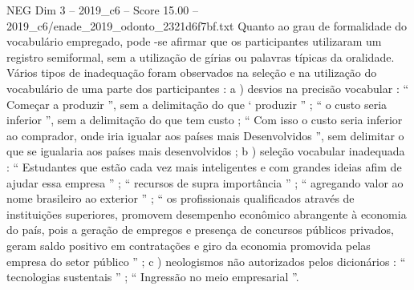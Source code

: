 \begin{textsample}{NEG Dim 3 – 2019\_c6 – Score 15.00 – 2019\_c6/enade\_2019\_odonto\_2321d6f7bf.txt}
Quanto ao grau de formalidade do vocabulário empregado, pode -se afirmar que os participantes utilizaram um registro semiformal, sem a utilização de gírias ou palavras típicas da oralidade.
Vários tipos de inadequação foram observados na seleção e na utilização do vocabulário de uma parte dos participantes : a ) desvios na precisão vocabular : “ Começar a produzir ”, sem a delimitação do que ‘ produzir ” ; “ o custo seria inferior ”, sem a delimitação do que tem custo ; “ Com isso o custo seria inferior ao comprador, onde iria igualar aos países mais Desenvolvidos ”, sem delimitar o que se igualaria aos países mais desenvolvidos ; b ) seleção vocabular inadequada : “ Estudantes que estão cada vez mais inteligentes e com grandes ideias afim de ajudar essa empresa ” ; “ recursos de supra importância ” ; “ agregando valor ao nome brasileiro ao exterior ” ; “ os profissionais qualificados através de instituições superiores, promovem desempenho econômico abrangente à economia do país, pois a geração de empregos e presença de concursos públicos privados, geram saldo positivo em contratações e giro da economia promovida pelas empresa do setor público ” ; c ) neologismos não autorizados pelos dicionários : “ tecnologias sustentais ” ; “ Ingressão no meio empresarial ”.

\end{textsample}

